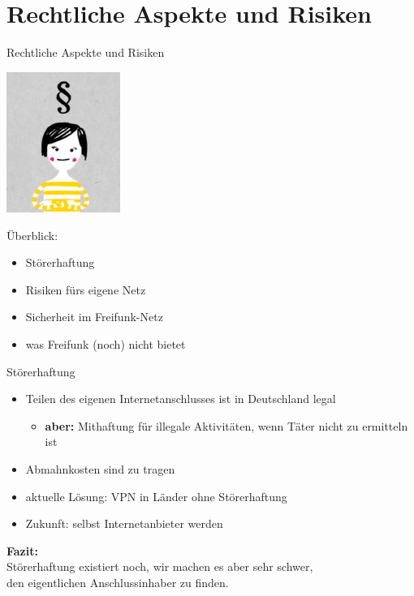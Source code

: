 \documentclass[handout, 10pt]{beamer}
\begin{document}
\section{Rechtliche Aspekte und Risiken}
\begin{frame}{Rechtliche Aspekte und Risiken}
\begin{Row}
\begin{Cell}{1}
\vspace{0.1cm}
\includegraphics[width=3.7cm]{images/recht}
\end{Cell}
\begin{Cell}{2}
\vspace{1cm}
Überblick:
\begin{itemize}
\pause \item Störerhaftung
\pause \item Risiken fürs eigene Netz
\pause \item Sicherheit im Freifunk-Netz
\pause \item was Freifunk (noch) nicht bietet
\end{itemize}
\end{Cell}
\end{Row}
\end{frame}

\begin{frame}{Störerhaftung}
\begin{itemize}
\pause\item Teilen des eigenen Internetanschlusses ist in Deutschland legal
\begin{itemize}
	\pause\item \textbf{aber:} Mithaftung für illegale Aktivitäten, wenn Täter nicht zu ermitteln ist
\end{itemize}
\pause\item Abmahnkosten sind zu tragen
\vfill
\pause\item aktuelle Lösung: VPN in Länder ohne Störerhaftung
\pause\item Zukunft: selbst Internetanbieter werden
\end{itemize}
\vfill
\centering
\pause \textbf{Fazit:}\\Störerhaftung existiert noch, wir machen es aber sehr schwer,\\den eigentlichen Anschlussinhaber zu finden.

\end{frame}
\end{document}
